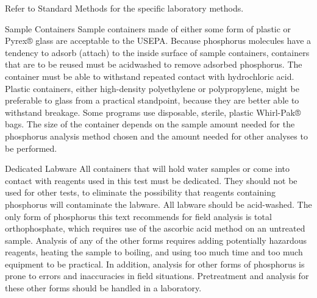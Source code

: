 \documentclass{article}
\begin{document}
Refer to Standard Methods for the specific laboratory methods.

Sample Containers Sample containers made of either some form of plastic
or Pyrex® glass are acceptable to the USEPA. Because phosphorus
molecules have a tendency to adsorb (attach) to the inside surface of
sample containers, containers that are to be reused must be acidwashed
to remove adsorbed phosphorus. The container must be able to withstand
repeated contact with hydrochloric acid. Plastic containers, either
high-density polyethylene or polypropylene, might be preferable to glass
from a practical standpoint, because they are better able to withstand
breakage. Some programs use disposable, sterile, plastic Whirl-Pak®
bags. The size of the container depends on the sample amount needed for
the phosphorus analysis method chosen and the amount needed for other
analyses to be performed.

Dedicated Labware All containers that will hold water samples or come
into contact with reagents used in this test must be dedicated. They
should not be used for other tests, to eliminate the possibility that
reagents containing phosphorus will contaminate the labware. All labware
should be acid-washed. The only form of phosphorus this text recommends
for field analysis is total orthophosphate, which requires use of the
ascorbic acid method on an untreated sample. Analysis of any of the
other forms requires adding potentially hazardous reagents, heating the
sample to boiling, and using too much time and too much equipment to be
practical. In addition, analysis for other forms of phosphorus is prone
to errors and inaccuracies in field situations. Pretreatment and
analysis for these other forms should be handled in a laboratory.
\end{document}
